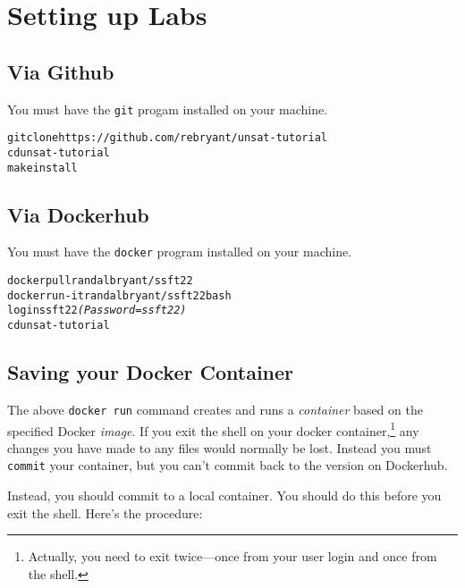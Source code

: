 \documentclass[12pt]{article}
\newenvironment{code}{\begin{alltt}\small}{\end{alltt}}
\begin{document}
\newpage

\section*{Setting up Labs}

\subsection*{Via Github}

You must have the {\tt git} progam installed on your machine.

\begin{code}
git clone https://github.com/rebryant/unsat-tutorial
cd unsat-tutorial
make install
\end{code}

\subsection*{Via Dockerhub}

You must have the {\tt docker} program installed on your machine.

\begin{code}
  docker pull randalbryant/ssft22
  docker run -it randalbryant/ssft22 bash
  login ssft22 \textit{(Password = ssft22)}
  cd unsat-tutorial
\end{code}

\subsection*{Saving your Docker Container}


The above \texttt{docker run} command creates and runs a {\em
  container} based on the specified Docker {\em image}.  If you exit the shell
on your docker container,\footnote{Actually, you need to exit twice---once from your user login and once from the shell.}
any changes you have made to any files
would normally be lost.  Instead you must \texttt{commit} your
container, but you can't commit back to the version on Dockerhub.

Instead, you should commit to a local container.  You should do this
before you exit the shell.  Here's the procedure:
\end{document}
